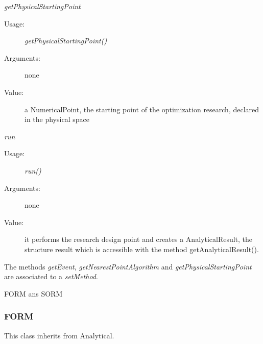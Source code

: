 \begin{description}
\begin{description}
\item \textit{getPhysicalStartingPoint}
\begin{description}
\item[Usage:] \textit{getPhysicalStartingPoint()}
\item[Arguments:] none
\item[Value:]  a NumericalPoint, the starting point of the optimization research, declared in the physical space
\end{description}
\bigskip

\item \textit{run}
\begin{description}
\item[Usage:] \textit{run()}
\item[Arguments:] none
\item[Value:]  it performs the research design point and creates a AnalyticalResult, the structure result which is accessible with the method getAnalyticalResult().
\end{description}
\bigskip

\end{description}
The methods \textit{getEvent}, \textit{getNearestPointAlgorithm} and \textit{getPhysicalStartingPoint} are associated to a \textit{setMethod}.

\item[Derivative Classes :] FORM ans SORM

\end{description}



\newpage
\subsubsection{FORM}

This class inherits from Analytical.


